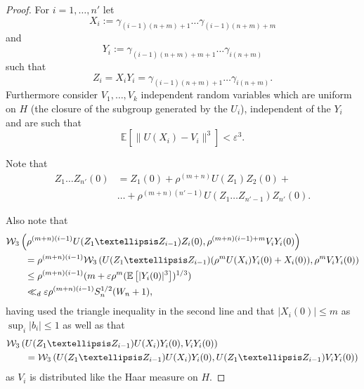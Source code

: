 \documentclass[10pt, english,oneside,reqno]{amsart}
\theoremstyle{plain}
\theoremstyle{remark}
\numberwithin{equation}{section}
\numberwithin{figure}{section}
\begin{document}
\begin{proof}
	For $i = 1, \dots, n'$ let $$X_i := \gamma_{(i-1)(n+m) + 1} \dots \gamma_{(i-1)(n+m)+m} $$ and $$Y_i := \gamma_{(i-1)(n+m) + m + 1} \dots \gamma_{i(n+m)}$$ such that $$Z_i = X_iY_i = \gamma_{(i-1)(n+m) + 1} \dots \gamma_{i(n+m)}.$$ Furthermore consider $V_1, \dots, V_k$ independent random variables which are uniform on $H$ (the closure of the subgroup generated by the $U_i$), independent of the $Y_i$ and are such that
	\begin{equation*}
		\mathbb{E} [\| U(X_i) - V_i \|^3] < \varepsilon^3.
	\end{equation*}
	
	Note that
	\begin{align*}
		Z_1 \dots Z_{n'} (0) &= Z_1(0) + \rho^{(m+n)} U(Z_1) Z_2 (0) + \\ & \dots + \rho^{(m+n)(n'-1)} U(Z_1 \dots Z_{n'-1}) Z_{n'} (0).
	\end{align*}
	
	Also note that
	\begin{align*}
	\MoveEqLeft \mathcal{W}_3\left(\rho^{(m+n)(i-1)} U(Z_1 \dots Z_{i-1}) Z_i (0), \rho^{(m+n)(i-1)+m} V_i Y_i(0) \right) \\ &= \rho^{(m+n)(i-1)}\mathcal{W}_3\left(U(Z_1 \dots Z_{i-1}) ( \rho^m U(X_i)Y_i(0) + X_i(0)), \rho^{m} V_i Y_i(0) \right) \\
    &\leq \rho^{(m+n)(i-1)}(m + \varepsilon \rho^{m} (\mathbb{E} \left[ | Y_i(0) |^3 \right])^{1/3})\\
	& \ll_d \varepsilon \rho^{(m+n)(i-1)} S_n^{1/2} (W_n + 1),
	\end{align*} having used the triangle inequality in the second line and that $|X_i(0)| \leq m$ as $\sup_i|b_i| \leq 1$ as well as that 
    \begin{align*}
        \MoveEqLeft \mathcal{W}_3\left(U(Z_1 \dots Z_{i-1})U(X_i)Y_i(0) , V_i Y_i(0) \right) \\ &= \mathcal{W}_3\left(U(Z_1 \dots Z_{i-1})U(X_i)Y_i(0), U(Z_1 \dots Z_{i-1})V_i Y_i(0) \right)
    \end{align*} 
    as $V_i$ is distributed like the Haar measure on $H$.
	

\end{proof}
\end{document}

